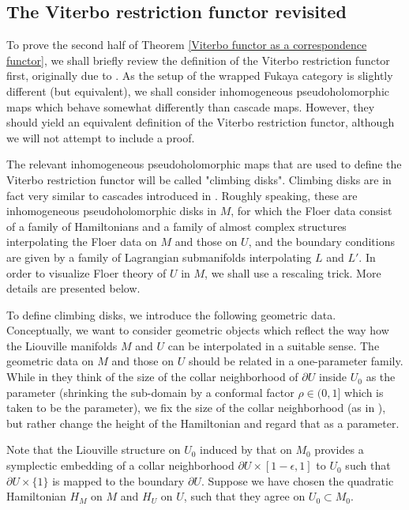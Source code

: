 \documentclass{amsart}
\numberwithin{equation}{section}
\numberwithin{figure}{section}
\begin{document}
\subsection{The Viterbo restriction functor revisited}\label{the Viterbo restriction functor}
	To prove the second half of Theorem \ref{Viterbo functor as a correspondence functor}, we shall briefly review the definition of the Viterbo restriction functor first, originally due to \cite{Abouzaid-Seidel}. As the setup of the wrapped Fukaya category is slightly different (but equivalent), we shall consider inhomogeneous pseudoholomorphic maps which behave somewhat differently than cascade maps. However, they should yield an equivalent definition of the Viterbo restriction functor, although we will not attempt to include a proof. \par
	The relevant inhomogeneous pseudoholomorphic maps that are used to define the Viterbo restriction functor will be called "climbing disks". Climbing disks are in fact very similar to cascades introduced in \cite{Abouzaid-Seidel}. Roughly speaking, these are inhomogeneous pseudoholomorphic disks in $M$, for which the Floer data consist of a family of Hamiltonians and a family of almost complex structures interpolating the Floer data on $M$ and those on $U$, and the boundary conditions are given by a family of Lagrangian submanifolds interpolating $L$ and $L'$. In order to visualize Floer theory of $U$ in $M$, we shall use a rescaling trick. More details are presented below. \par
	To define climbing disks, we introduce the following geometric data. Conceptually, we want to consider geometric objects which reflect the way how the Liouville manifolds $M$ and $U$ can be interpolated in a suitable sense. The geometric data on $M$ and those on $U$ should be related in a one-parameter family. While in \cite{Abouzaid-Seidel} they think of the size of the collar neighborhood of $\partial U$ inside $U_{0}$ as the parameter (shrinking the sub-domain by a conformal factor $\rho \in (0, 1]$ which is taken to be the parameter), we fix the size of the collar neighborhood (as in \cite{Viterbo1}), but rather change the height of the Hamiltonian and regard that as a parameter. \par
	Note that the Liouville structure on $U_{0}$ induced by that on $M_{0}$ provides a symplectic embedding of a collar neighborhood $\partial U \times [1-\epsilon, 1]$ to $U_{0}$ such that $\partial U \times \{1\}$ is mapped to the boundary $\partial U$. Suppose we have chosen the quadratic Hamiltonian $H_{M}$ on $M$ and $H_{U}$ on $U$, such that they agree on $U_{0} \subset M_{0}$. 
\end{document}
